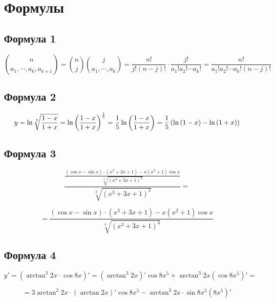 \documentclass{report}
\begin{document}
\chapter{Формулы}
\section{ Формула 1}


\[\binom{n}{a_{1} , \cdots, a_{k}, a_{k+1}} = \binom{n}{j}  \binom{j}{a_{1} , \cdots, a_{k}} = \frac{n!}{j!(n-j)!} \cdot \frac{j!}{a_{1}!a_{2}! \cdots a_{k}! } = \frac{n!}{a_{1}!a_{2}! \cdots a_{k}! (n-j)! }\]

\section{ Формула 2}

\[ y = \ln {\sqrt[5]{\frac{1-x}{1+x}}} = \ln {\left( {{1-x}\over {1+x}} \right)^{\frac{1}{5}}} = \frac{1}{5} \ln {\left( {{1-x}\over {1+x}} \right)}
= \frac{1}{5} \left( {\ln{\left( {1-x } \right)}  - \ln{\left( {1+x } \right)}} \right)\]

\section{ Формула 3}

\[\frac{\frac{\left({\cos {x} - \sin{x} }\right) \cdot  
\left({x^{3} + {3}{x}+1} \right) - x \left({x^{2} + 1} \right) \cos{x}}
{\sqrt[3]{\left({{x^{3} + {3}{x}+1}}\right) ^{2}}}}{\sqrt[3]{\left({{x^{3} + {3}{x}+1}}\right) ^{2}}} = \] 

\[ = {\frac{\left({\cos {x} - \sin{x} }\right) \cdot  
\left({x^{3} + {3}{x}+1} \right) - x \left({x^{2} + 1} \right) \cos{x}}
{\sqrt[3]{\left({{x^{3} + {3}{x}+1}}\right) ^{4}}}} \]

\section{ Формула 4}

\[ y' = {\left({\arctan^{3} {2x} \cdot \cos{8x} }\right)'} = {\left({\arctan^{3} {2x}}\right)' \cos{8{x}^{5}}} + {\arctan^{3} {2x}}{\left({\cos{8{x}^{5}}}\right)'} = \]

\[ = {3\arctan^{2}{2x} \cdot \left({\arctan {2x}}\right)' \cos{8{x}^{5}}} - {{\arctan^{3} {2x}} \cdot \sin{8{x}^{5}} \left({{8{x}^{5}}}\right)'} \]







\end{document}
